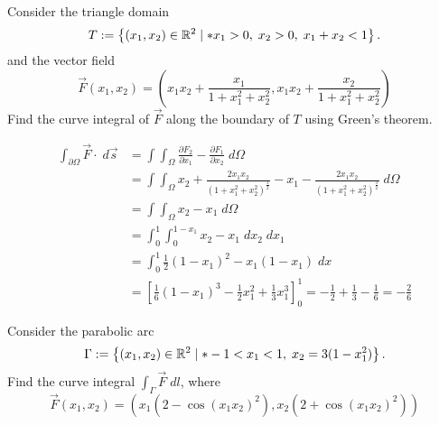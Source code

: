 \documentclass[11pt]{article}
\begin{document}
\begin{exercise}
    Consider the triangle domain 
    \[
        T := \left\{ (x_1,x_2) \in \bbR^{2} \suchthat* x_1 > 0, \; x_2 > 0, \; x_1+x_2 < 1 \right\}.
    \]
    and the vector field 
    \[
        \vec F(x_1,x_2) = \left( x_1x_2 + \frac{x_1}{1+x_1^2+x_2^2}, x_1x_2 + \frac{x_2}{1+x_1^2+x_2^2} \right)
    \]
    Find the curve integral of $\vec F$ along the boundary of $T$ using Green's theorem.
\end{exercise}
\begin{solution}
\begin{align*}
    \int_{\partial \Omega} \vec{F} \cdot \; d \vec{s} &= \int\int_{\Omega} \frac{\partial F_2}{\partial x_1} - \frac{\partial F_1}{\partial x_2}\; d \Omega\\
&= \int\int_{\Omega} x_2 + \frac{2x_1x_2}{(1+x_1^ 2 + x_2^ 2)^ {\frac{3}{2}}} - x_1 - \frac{2x_1x_2}{(1+x_1^ 2 + x_2^ 2)^ {\frac{3}{2}}} \; d \Omega\\
&= \int\int_{\Omega} x_2  - x_1\; d \Omega\\
&= \int_0^ 1\int_0^ {1-x_1} x_2 - x_1 \;dx_2\;dx_1\\
&= \int_0^ 1 \frac{1}{2}(1-x_1)^ 2 - x_1(1-x_1) \;d x\\
&= \left[ \frac{1}{6}(1-x_1)^ 3 - \frac{1}{2} x_1^2 + \frac{1}{3}x_1^ 3 \right]_0^1 = -\frac{1}{2} + \frac{1}{3} - \frac{1}{6} = -\frac{2}{6}
\end{align*}
\end{solution}
















\begin{exercise}
    Consider the parabolic arc 
    \[
        \Gamma := \left\{ (x_1,x_2) \in \bbR^{2} \suchthat* -1 < x_1 < 1, \; x_2 = 3 ( 1 - x_1^2 ) \right\}.
    \]
    Find the curve integral $\int_\Gamma \vec F \;dl$, where 
    \[
        \vec F(x_1,x_2) = \left( x_1 ( 2 - \cos(x_1x_2)^{2} ), x_2 ( 2 + \cos(x_1x_2)^{2} ) \right)
    \]
\end{exercise}
\begin{solution}
\end{solution}
\end{document}
